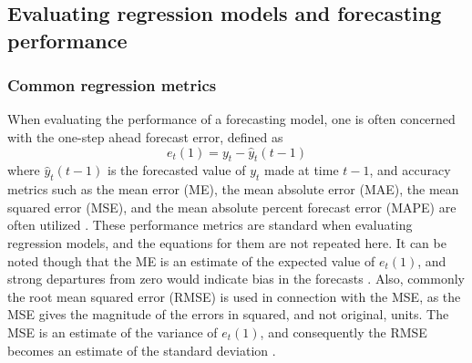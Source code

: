 





 
\subsection{Evaluating regression models and forecasting performance}
\label{sec:reg_metrics}
\subsubsection{Common regression metrics}
When evaluating the performance of a forecasting model, one is often concerned with the one-step ahead forecast error, defined as
$$e_t(1) = y_t - \hat{y}_t (t-1)$$ 
where $\hat{y}_t (t-1)$ is the forecasted value of $y_t$ made at time $t-1$, and accuracy metrics such as the mean error (ME), the mean absolute error (MAE), the mean squared error (MSE), and the mean absolute percent forecast error (MAPE) are often utilized \cite{Montgomery2015}. These performance metrics are standard when evaluating regression models, and the equations for them are not repeated here. It can be noted though that the ME is an estimate of the expected value of $e_t(1)$, and strong departures from zero would indicate bias in the forecasts \cite{Montgomery2015}. Also, commonly the root mean squared error (RMSE) is used in connection with the MSE, as the MSE gives the magnitude of the errors in squared, and not original, units. The MSE is an estimate of the variance of $e_t(1)$, and consequently the RMSE becomes an estimate of the standard deviation \cite{Montgomery2012}. 

